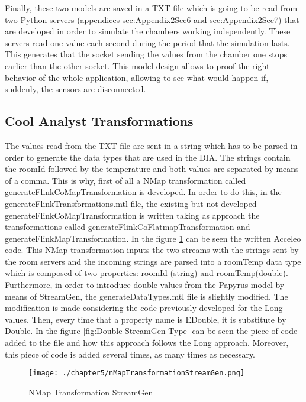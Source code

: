 Finally, these two models are saved in a TXT file which is going to be read from two Python servers (appendices {sec:Appendix2Sec6} and {sec:Appendix2Sec7}) that are developed in order to simulate the chambers working independently. These servers read one value each second during the period that the simulation lasts. This generates that the socket sending the values from the chamber one stops earlier than the other socket. This model design allows to proof the right behavior of the whole application, allowing to see what would happen if, suddenly, the sensors are disconnected.

\subsection{Cool Analyst Transformations}

The values read from the TXT file are sent in a string which has to be parsed in order to generate the data types that are used in the DIA. The strings contain the roomId followed by the temperature and both values are separated by means of a comma. This is why, first of all a NMap transformation called generateFlinkCoMapTransformation is developed. In order to do this, in the generateFlinkTransformations.mtl file, the existing but not developed generateFlinkCoMapTransformation is written taking as approach the transformations called generateFlinkCoFlatmapTransformation and generateFlinkMapTransformation. In the figure \ref{fig:NMap Transformation StreamGen} can be seen the written Acceleo code. This NMap transformation inputs the two streams with the strings sent by the room servers and the incoming strings are parsed into a roomTemp data type which is composed of two properties: roomId (string) and roomTemp(double). Furthermore, in order to introduce double values from the Papyrus model by means of StreamGen, the generateDataTypes.mtl file is slightly modified. The modification is made considering the code previously developed for the Long values. Then, every time that a property name is EDouble, it is substitute by Double. In the figure \ref{fig:Double StreamGen Type} can be seen the piece of code added to the file and how this approach follows the Long approach. Moreover, this piece of code is added several times, as many times as necessary.

\begin{figure}
\centering
{\texttt{[image: ./chapter5/nMapTransformationStreamGen.png]}}
\caption{NMap Transformation StreamGen}
\label{fig:NMap Transformation StreamGen}
\end{figure}


